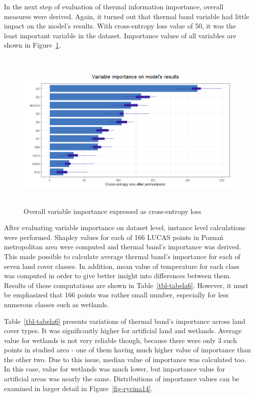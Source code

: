 \documentclass{amuthesis}
\begin{document}
In the next step of evaluation of thermal information importance,
overall measures were derived. Again, it turned out that thermal band
variable had little impact on the model's results. With cross-entropy
loss value of 50, it was the least important variable in the dataset.
Importance values of all variables are shown in
Figure~\ref{fig-rycina13}.

\begin{figure}[H]

{\centering \includegraphics[width=5.625in,height=3.125in]{./figures/importance.png}

}

\caption{\label{fig-rycina13}Overall variable importance expressed as
cross-entropy loss}

\end{figure}

After evaluating variable importance on dataset level, instance level
calculations were performed. Shapley values for each of 166 LUCAS points
in Poznań metropolitan area were computed and thermal band's importance
was derived. This made possible to calculate average thermal band's
importance for each of seven land cover classes. In addition, mean value
of temperature for each class was computed in order to give better
insight into differences between them. Results of these computations are
shown in Table~\ref{tbl-tabela6}. However, it must be emphasized that
166 points was rather small number, especially for less numerous classes
such as wetlands.

Table~\ref{tbl-tabela6} presents variations of thermal band's importance
across land cover types. It was significantly higher for artificial land
and wetlands. Average value for wetlands is not very reliable though,
because there were only 3 such points in studied area - one of them
having much higher value of importance than the other two. Due to this
issue, median value of importance was calculated too. In this case,
value for wetlands was much lower, but importance value for artificial
areas was nearly the same. Distributions of importance values can be
examined in larger detail in Figure~\ref{fig-rycina14}.
\end{document}
